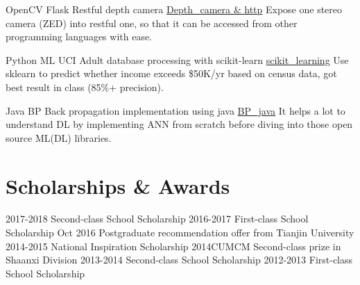 \documentclass[utf8]{twentysecondcv} %
\begin{document}
\begin{twenty}
		\twentyitem
        {OpenCV}
        {Flask}
        {Restful depth camera}
        {\href{https://github.com/MiaoDX/depth\_camera}{Depth\_camera \& http}}
        {}
        {Expose one stereo camera (ZED) into restful one, so that it can be accessed from other programming languages with ease.}

	    \twentyitem
        {Python}
		{ML}
        {UCI Adult database processing with scikit-learn}
        {\href{https://github.com/MiaoDX/scikit\_learning/}{scikit\_learning}}
        {}
        {Use sklearn to predict whether income exceeds \$50K/yr based on census data, got best result in class (85\%+ precision).}
        
        \twentyitem
        {Java}
       	{BP}
        {Back propagation implementation using java}
        {\href{https://github.com/MiaoDX/bp_java}{BP\_java}}
        {}                
        {It helps a lot to understand DL by implementing ANN from scratch before diving into those open source ML(\/DL) libraries.}
		


\end{twenty}


\section{Scholarships \& Awards}

\begin{twentyshort}
    \twentyitemshort
        {2017-2018}
        {Second-class School Scholarship}
	\twentyitemshort
        {2016-2017}
        {First-class School Scholarship}
	\twentyitemshort
		{Oct 2016}        
		{Postgraduate recommendation offer from Tianjin University}
	\twentyitemshort
		{2014-2015}
		{National Inspiration Scholarship}
	\twentyitemshort
		{2014CUMCM}
		{Second-class prize in Shaanxi Division}
	\twentyitemshort
		{2013-2014}
		{Second-class School Scholarship}		
	\twentyitemshort
		{2012-2013}
		{First-class School Scholarship}		
\end{twentyshort}        
\end{document}
